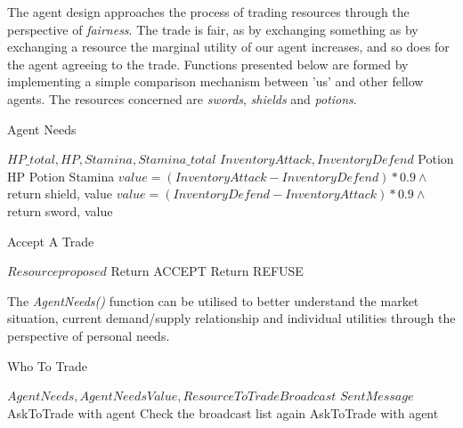 The agent design approaches the process of trading resources through the perspective of \textit{fairness}. The trade is fair, as by exchanging something as by exchanging a resource the marginal utility of our agent increases, and so does for the agent agreeing to the trade. Functions presented below are formed by implementing a simple comparison mechanism between 'us' and other fellow agents. The resources concerned are \textit{swords}, \textit{shields} and \textit{potions}.

\begin{algorithm}
\caption{Agent Needs}
\begin{algorithmic} 
\Require $HP\_total, HP, Stamina, Stamina\_total$
\Require $InventoryAttack,InventoryDefend $
\State Potion HP
\EndIf
{}
\State Potion Stamina
\EndIf
{}
\State $value = (InventoryAttack - InventoryDefend)*0.9 \land$ return shield, value
\Else
\State $value = (InventoryDefend - InventoryAttack)*0.9 \land$ return sword, value
\EndIf
\end{algorithmic}
\end{algorithm}

\begin{algorithm}
\caption{Accept A Trade}
\begin{algorithmic} 
\Require $Resourceproposed$
\State Return ACCEPT
\Else
\State Return REFUSE
\EndIf
\end{algorithmic}
\end{algorithm}

The \textit{AgentNeeds()} function can be utilised to better understand the market situation, current demand/supply relationship and individual utilities through the perspective of personal needs.

\begin{algorithm}
\caption{Who To Trade}
\begin{algorithmic} 
\Require $AgentNeeds, AgentNeedsValue, ResourceToTradeBroadcast$
\Require $SentMessage $
\State AskToTrade with agent
\EndIf
{}
\State Check the broadcast list again
\State AskToTrade with agent
\EndIf
\EndIf
\end{algorithmic}
\end{algorithm}

